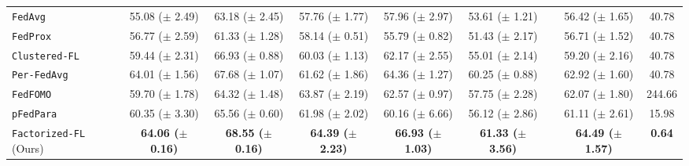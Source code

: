 \begin{table*}[t]
{\begin{tabular}{l c c c c c c cc}
    \texttt{FedAvg}~\citep{McMahan2017CommunicationEfficientLO} & 
    {55.08} \scriptsize($\pm$ 2.49) & 
    {63.18} \scriptsize($\pm$ 2.45) & 
    {57.76} \scriptsize($\pm$ 1.77) & 
    {57.96} \scriptsize($\pm$ 2.97) & 
    {53.61} \scriptsize($\pm$ 1.21) & &
    {56.42} \scriptsize($\pm$ 1.65) & {40.78}  \\
    
    \texttt{FedProx}~\citep{li2018federated} & 
    {56.77} \scriptsize($\pm$ 2.59) & 
    {61.33} \scriptsize($\pm$ 1.28) & 
    {58.14} \scriptsize($\pm$ 0.51) & 
    {55.79} \scriptsize($\pm$ 0.82) & 
    {51.43} \scriptsize($\pm$ 2.17) & &
    {56.71} \scriptsize($\pm$ 1.52) & {40.78} \\
    
    \texttt{Clustered-FL}~\citep{sattler2019clustered} & 
    {59.44} \scriptsize($\pm$ 2.31) & 
    {66.93} \scriptsize($\pm$ 0.88) & 
    {60.03} \scriptsize($\pm$ 1.13) & 
    {62.17} \scriptsize($\pm$ 2.55) & 
    {55.01} \scriptsize($\pm$ 2.14) & &
    {59.20} \scriptsize($\pm$ 2.16) & {40.78}\\
    
    \texttt{Per-FedAvg}~\citep{fallah2020personalized} & 
    {64.01} \scriptsize($\pm$ 1.56) & 
    {67.68} \scriptsize($\pm$ 1.07) & 
    {61.62} \scriptsize($\pm$ 1.86) & 
    {64.36} \scriptsize($\pm$ 1.27) & 
    {60.25} \scriptsize($\pm$ 0.88) & &
    {62.92} \scriptsize($\pm$ 1.60) & {40.78}\\
    
    \texttt{FedFOMO}~\citep{zhang2021personalized} & 
    {59.70} \scriptsize($\pm$ 1.78) & 
    {64.32} \scriptsize($\pm$ 1.48) & 
    {63.87} \scriptsize($\pm$ 2.19) & 
    {62.57} \scriptsize($\pm$ 0.97) & 
    {57.75} \scriptsize($\pm$ 2.28) & &
    {62.07} \scriptsize($\pm$ 1.80) & {244.66} \\
    
    \texttt{pFedPara}~\citep{anonymous2022fedpara} &
    {60.35} \scriptsize($\pm$ 3.30) & 
    {65.56} \scriptsize($\pm$ 0.60) & 
    {61.98} \scriptsize($\pm$ 2.02) & 
    {60.16} \scriptsize($\pm$ 6.66) & 
    {56.12} \scriptsize($\pm$ 2.86) & &
    {61.11} \scriptsize($\pm$ 2.61) & {15.98} \\
    
    \cmidrule{1-9}
    \texttt{Factorized-FL} (Ours) & 
    \textbf{{64.06} \scriptsize($\pm$ 0.16)} & 
    \textbf{{68.55} \scriptsize($\pm$ 0.16)} & 
    \textbf{{64.39} \scriptsize($\pm$ 2.23)} & 
    \textbf{{66.93} \scriptsize($\pm$ 1.03)} & 
    \textbf{{61.33} \scriptsize($\pm$ 3.56)} & &
    \textbf{{64.49} \scriptsize($\pm$ 1.57)} & \textbf{{0.64}} \\
    
    \midrule
    \bottomrule
    \end{tabular}}
    
\end{table*}


